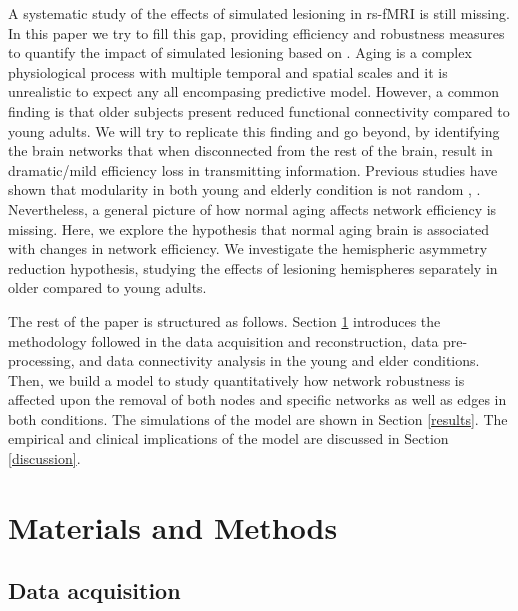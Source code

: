 \documentclass[12pt,a4paper]{article}
\begin{document}
A systematic study of the effects of simulated lesioning in rs-fMRI is still missing. 
In this paper we try to fill this gap, providing efficiency and robustness measures to quantify the impact of simulated lesioning  based on \cite{latora_efficient_2001}.
Aging is a complex physiological process with multiple temporal and spatial scales and it is unrealistic to expect any all encompasing predictive model. However, a common finding is that older subjects present reduced functional connectivity compared to young adults. We will try to replicate this finding and go beyond, by identifying the brain networks that when disconnected from the rest of the brain, result in dramatic/mild efficiency loss in transmitting information. 
Previous studies have shown that modularity in both young and elderly condition is not random \cite{meunier_age-related_2009}, \cite{song_age-related_2014}. Nevertheless, a general picture of how normal aging affects network efficiency is missing. Here, we explore the hypothesis that normal aging brain is associated with changes in network efficiency. 
We investigate the hemispheric asymmetry reduction hypothesis, studying the effects of lesioning hemispheres separately in older compared to young adults.  

The rest of the paper is structured as follows. Section \ref{mat-methods} introduces the 
methodology followed in the data acquisition and reconstruction, data
pre-processing, and data connectivity analysis in the young and elder conditions. Then, we build a model to study quantitatively how network robustness is affected upon the removal of both nodes and specific networks as well as edges in both conditions. The simulations of the model are shown in Section \ref{results}. The empirical and clinical implications of the model are discussed in Section \ref{discussion}. 

\section{Materials and Methods}
\label{mat-methods}

\subsection{Data acquisition}
\end{document}
